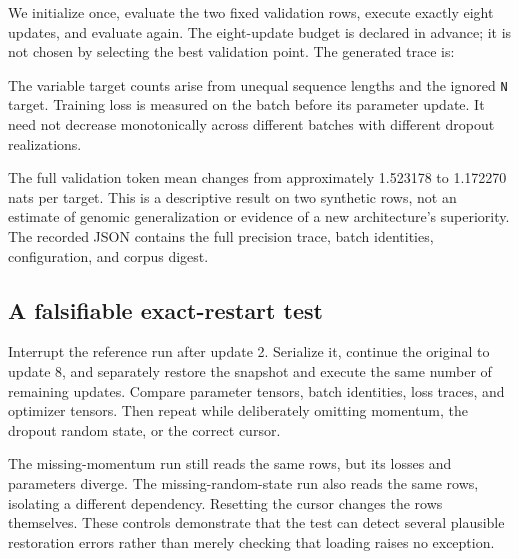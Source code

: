 We initialize once, evaluate the two fixed validation rows, execute exactly eight updates, and evaluate again. The eight-update budget is declared in advance; it is not chosen by selecting the best validation point. The generated trace is:

\begin{center}\end{center}

The variable target counts arise from unequal sequence lengths and the ignored \texttt{N} target. Training loss is measured on the batch before its parameter update. It need not decrease monotonically across different batches with different dropout realizations.

The full validation token mean changes from approximately 1.523178 to 1.172270 nats per target. This is a descriptive result on two synthetic rows, not an estimate of genomic generalization or evidence of a new architecture's superiority. The recorded JSON contains the full precision trace, batch identities, configuration, and corpus digest.

\subsection{A falsifiable exact-restart test}

Interrupt the reference run after update 2. Serialize it, continue the original to update 8, and separately restore the snapshot and execute the same number of remaining updates. Compare parameter tensors, batch identities, loss traces, and optimizer tensors. Then repeat while deliberately omitting momentum, the dropout random state, or the correct cursor.


\begin{center}\small\end{center}

The missing-momentum run still reads the same rows, but its losses and parameters diverge. The missing-random-state run also reads the same rows, isolating a different dependency. Resetting the cursor changes the rows themselves. These controls demonstrate that the test can detect several plausible restoration errors rather than merely checking that loading raises no exception.


